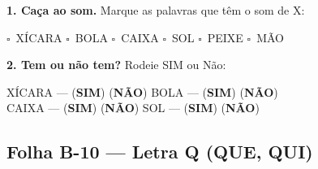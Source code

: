 \begin{somletra}[title={\faMusic~Atividade de Som da Letra --- B\^onus (n\~ao vale nota)}]
\textbf{1. Ca\c{c}a ao som.} Marque as palavras que t\^e{}m o som de X:
\begin{center}
$\square$~X\'ICARA \quad $\square$~BOLA \quad $\square$~CAIXA \quad $\square$~SOL \quad $\square$~PEIXE \quad $\square$~M\~AO
\end{center}

\textbf{2. Tem ou n\~ao{} tem?} Rodeie SIM ou N\~ao:
\begin{center}
X\'ICARA --- (\textbf{SIM}) (\textbf{N\~AO}) \quad BOLA --- (\textbf{SIM}) (\textbf{N\~AO}) \\ CAIXA --- (\textbf{SIM}) (\textbf{N\~AO}) \quad SOL --- (\textbf{SIM}) (\textbf{N\~AO})
\end{center}
\end{somletra}



\subsection{Folha B-10 --- Letra Q (QUE, QUI)}

